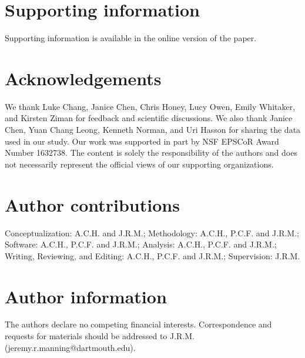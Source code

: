 \documentclass{article}
\begin{document}
% 


\section*{Supporting information}
Supporting information is available in the online version of the paper.

\section*{Acknowledgements}
We thank Luke Chang, Janice Chen, Chris Honey, Lucy Owen, Emily Whitaker, and Kirsten Ziman for feedback and scientific discussions. We also thank Janice Chen, Yuan Chang Leong, Kenneth Norman, and Uri Hasson for sharing the data used in our study.  Our work was supported in part by NSF EPSCoR Award Number 1632738. The content is solely the responsibility of the authors and does not necessarily represent the official views of our supporting organizations.

\section*{Author contributions}
Conceptualization: A.C.H. and J.R.M.; Methodology: A.C.H., P.C.F. and J.R.M.; Software: A.C.H., P.C.F. and J.R.M.; Analysis: A.C.H., P.C.F. and J.R.M.; Writing, Reviewing, and Editing: A.C.H., P.C.F. and J.R.M.; Supervision: J.R.M.

\section*{Author information}
The authors declare no competing financial interests.  Correspondence and requests for materials should be addressed to J.R.M. (jeremy.r.manning@dartmouth.edu).
\end{document}
